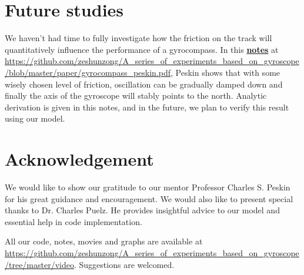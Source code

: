 \documentclass[12pt]{article}
\renewcommand{\(}{\left (}
\renewcommand{\)}{\right )}
\begin{document}
\section{Future studies}
\hspace{5mm} We haven't had time to fully investigate how the friction on the track will quantitatively influence the performance of a gyrocompass. In this \href{https://github.com/zeshunzong/A_series_of_experiments_based_on_gyroscope/blob/master/paper/gyrocompass_peskin.pdf}{\textbf{notes}} at \url{https://github.com/zeshunzong/A_series_of_experiments_based_on_gyroscope/blob/master/paper/gyrocompass_peskin.pdf}, Peskin shows that with some wisely chosen level of friction, oscillation can be gradually damped down and finally the axis of the gyroscope will stably points to the north. Analytic derivation is given in this notes, and in the future, we plan to verify this result using our model.




\section{Acknowledgement}

\hspace{5mm} We would like to show our gratitude to our mentor Professor Charles S. Peskin for his great guidance and encouragement. We would also like to present special thanks to Dr. Charles Puelz. He provides insightful advice to our model and essential help in code implementation.

All our code, notes, movies and graphs are available at \url{https://github.com/zeshunzong/A_series_of_experiments_based_on_gyroscope/tree/master/video}. Suggestions are welcomed.
\end{document}
